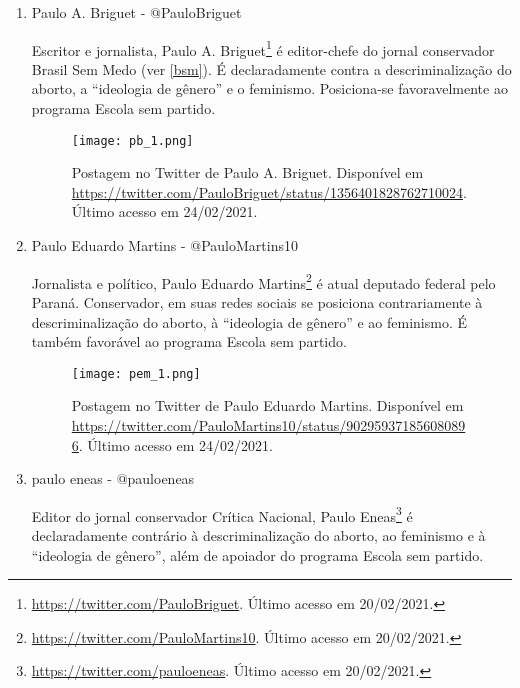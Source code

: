 \documentclass[
	12pt,				%
	openright,			%
	twoside,			%
	a4paper,			%
	english,			%
	brazil				%
	]{abntex2}
\begin{document}
\begin{anexosenv}
\begin{enumerate}
 \begin{figure}[!htbp]
    \centering
    \texttt{[image: ppm\_1.png]}
    \caption{Postagem no Twitter de Paula Marisa. Disponível em \url{https://twitter.com/profpaulamarisa/status/1104094135315763200}. Último acesso em 24/02/2021.}
 \end{figure}
  
 \item Paulo A. Briguet - @PauloBriguet
 
 Escritor e jornalista, Paulo A. Briguet\footnote{\url{https://twitter.com/PauloBriguet}. Último acesso em 20/02/2021.} é editor-chefe do jornal conservador Brasil Sem Medo (ver \ref{bsm}). É declaradamente contra a descriminalização do aborto, a ``ideologia de gênero'' e o feminismo. Posiciona-se favoravelmente ao programa Escola sem partido.
 
 \begin{figure}[!htbp]
    \centering
    \texttt{[image: pb\_1.png]}
    \caption{Postagem no Twitter de Paulo A. Briguet. Disponível em \url{https://twitter.com/PauloBriguet/status/1356401828762710024}. Último acesso em 24/02/2021.}
 \end{figure}
 
  \item Paulo Eduardo Martins - @PauloMartins10
 
 Jornalista e político, Paulo Eduardo Martins\footnote{\url{https://twitter.com/PauloMartins10}. Último acesso em 20/02/2021.} é atual deputado federal pelo Paraná. Conservador, em suas redes sociais se posiciona contrariamente à descriminalização do aborto, à ``ideologia de gênero'' e ao feminismo. É também favorável ao programa Escola sem partido.
 
 \begin{figure}[!htbp]
    \centering
    \texttt{[image: pem\_1.png]}
    \caption{Postagem no Twitter de Paulo Eduardo Martins. Disponível em \url{https://twitter.com/PauloMartins10/status/902959371856080896}. Último acesso em 24/02/2021.}
 \end{figure}
  
 \newpage
 
 \item paulo eneas - @pauloeneas
 
 Editor do jornal conservador Crítica Nacional, Paulo Eneas\footnote{\url{https://twitter.com/pauloeneas}. Último acesso em 20/02/2021.} é declaradamente contrário à descriminalização do aborto, ao feminismo e à ``ideologia de gênero'', além de apoiador do programa Escola sem partido.
 

\end{enumerate}
\end{anexosenv}
\end{document}
